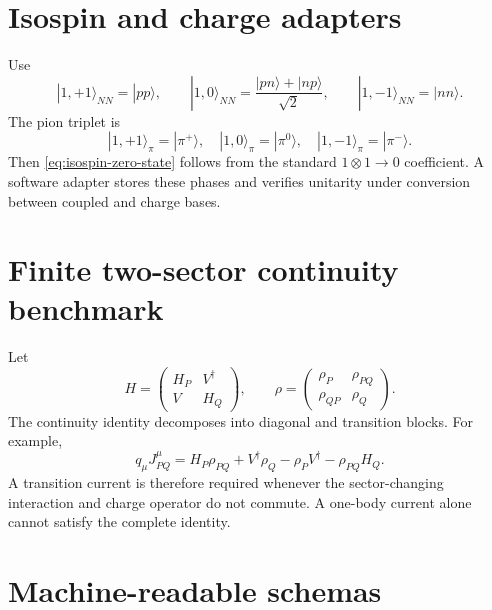 \documentclass[11pt]{article}
\begin{document}
\section{Isospin and charge adapters}
\label{app:isospin}

Use
\begin{equation}
 |1,+1\rangle_{NN}=|pp\rangle,
 \qquad
 |1,0\rangle_{NN}=\frac{|pn\rangle+|np\rangle}{\sqrt2},
 \qquad
 |1,-1\rangle_{NN}=|nn\rangle.
 \label{eq:triplet-nn}
\end{equation}
The pion triplet is
\begin{equation}
 |1,+1\rangle_{\pi}=|\pi^+\rangle,
 \quad
 |1,0\rangle_{\pi}=|\pi^0\rangle,
 \quad
 |1,-1\rangle_{\pi}=|\pi^-\rangle.
 \label{eq:pion-triplet}
\end{equation}
Then \cref{eq:isospin-zero-state} follows from the standard
\(1\otimes1\to0\) coefficient.  A software adapter stores these phases and
verifies unitarity under conversion between coupled and charge bases.

\section{Finite two-sector continuity benchmark}
\label{app:continuity}

Let
\begin{equation}
 H=\begin{pmatrix}H_P&V^{\dagger}\\V&H_Q\end{pmatrix},
 \qquad
 \rho=\begin{pmatrix}\rho_P&\rho_{PQ}\\\rho_{QP}&\rho_Q\end{pmatrix}.
 \label{eq:two-sector-h-rho}
\end{equation}
The continuity identity decomposes into diagonal and transition blocks.  For
example,
\begin{equation}
 q_{\mu}J_{PQ}^{\mu}
 =H_P\rho_{PQ}+V^{\dagger}\rho_Q
 -\rho_PV^{\dagger}-\rho_{PQ}H_Q.
 \label{eq:transition-continuity}
\end{equation}
A transition current is therefore required whenever the sector-changing
interaction and charge operator do not commute.  A one-body current alone
cannot satisfy the complete identity.

\section{Machine-readable schemas}
\label{app:schemas}
\end{document}
